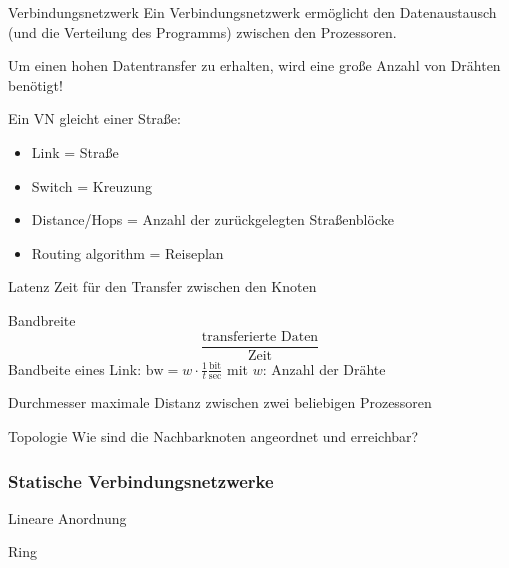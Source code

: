 \begin{defi}{Verbindungsnetzwerk}
     Ein Verbindungsnetzwerk ermöglicht den Datenaustausch (und die Verteilung des Programms) zwischen den Prozessoren.

     Um einen hohen Datentransfer zu erhalten, 
     wird eine große Anzahl von Drähten benötigt!

     Ein VN gleicht einer Straße:
     \begin{itemize}
        \item Link = Straße
        \item Switch = Kreuzung 
        \item Distance/Hops = Anzahl der zurückgelegten Straßenblöcke
        \item Routing algorithm = Reiseplan
     \end{itemize}

\end{defi}

\begin{defi}[Verbindungsnetzwerk]{Latenz}
    Zeit für den Transfer zwischen den Knoten
\end{defi}

\begin{defi}[Verbindungsnetzwerk]{Bandbreite}
    \[\frac{\text{transferierte Daten}}{\text{Zeit}}\]
    Bandbeite eines Link: $\text{bw} = w \cdot \frac{1}{t}\frac{\text{bit}}{\text{sec}}$
    mit $w$: Anzahl der Drähte
\end{defi}

\begin{defi}[Verbindungsnetzwerk]{Durchmesser}
    maximale Distanz zwischen zwei beliebigen Prozessoren
\end{defi}

\begin{defi}[Verbindungsnetzwerk]{Topologie}
    Wie sind die Nachbarknoten angeordnet und erreichbar?
\end{defi}

\subsubsection{Statische Verbindungsnetzwerke}

\begin{defi}{Lineare Anordnung}
    
\end{defi}

\begin{defi}{Ring}
    
\end{defi}

